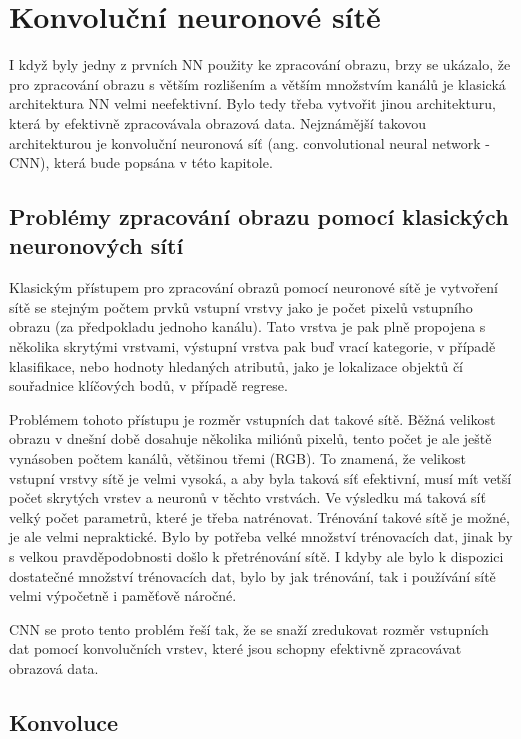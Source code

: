 \chapter{Konvoluční neuronové sítě}
\label{sec:CNN}

I když byly jedny z prvních NN použity ke zpracování obrazu, brzy se ukázalo,
že pro zpracování obrazu s větším rozlišením a větším množstvím kanálů je
klasická architektura NN velmi neefektivní. Bylo tedy třeba vytvořit jinou
architekturu, která by efektivně zpracovávala obrazová data. Nejznámější
takovou architekturou je konvoluční neuronová síť (ang. convolutional neural
network - CNN), která bude popsána v této kapitole.

\section{Problémy zpracování obrazu pomocí klasických neuronových sítí}

Klasickým přístupem pro zpracování obrazů pomocí neuronové sítě je vytvoření
sítě se stejným počtem prvků vstupní vrstvy jako je počet pixelů vstupního
obrazu (za předpokladu jednoho kanálu). Tato vrstva je pak plně propojena s
několika skrytými vrstvami, výstupní vrstva pak buď vrací kategorie, v případě
klasifikace, nebo hodnoty hledaných atributů, jako je lokalizace objektů čí
souřadnice klíčových bodů, v případě regrese.

Problémem tohoto přístupu je rozměr vstupních dat takové sítě. Běžná velikost
obrazu v dnešní době dosahuje několika miliónů pixelů, tento počet je ale ještě
vynásoben počtem kanálů, většinou třemi (RGB). To znamená, že velikost vstupní
vrstvy sítě je velmi vysoká, a aby byla taková síť efektivní, musí mít vetší
počet skrytých vrstev a neuronů v těchto vrstvách. Ve výsledku má taková síť
velký počet parametrů, které je třeba natrénovat. Trénování takové sítě je
možné, je ale velmi nepraktické. Bylo by potřeba velké množství trénovacích
dat, jinak by s velkou pravděpodobnosti došlo k přetrénování sítě. I kdyby ale
bylo k dispozici dostatečné množství trénovacích dat, bylo by jak trénování,
tak i používání sítě velmi výpočetně i paměťově náročné.

CNN se proto tento problém řeší tak, že se snaží zredukovat rozměr vstupních
dat pomocí konvolučních vrstev, které jsou schopny efektivně zpracovávat
obrazová data.

\section{Konvoluce}

